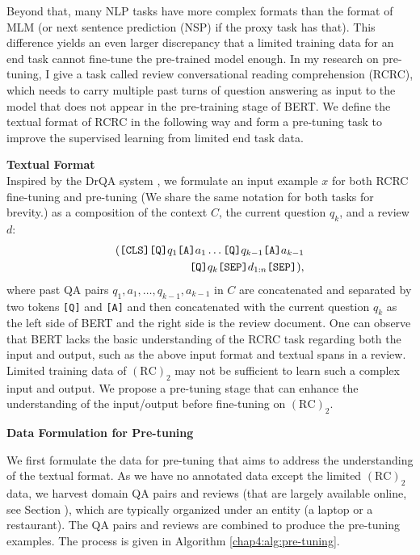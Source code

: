 Beyond that, many NLP tasks have more complex formats than the format of MLM (or next sentence prediction (NSP) if the proxy task has that).
This difference yields an even larger discrepancy that a limited training data for an end task cannot fine-tune the pre-trained model enough.
In my research on pre-tuning, I give a task called review conversational reading comprehension (RCRC), which needs to carry multiple past turns of question answering as input to the model that does not appear in the pre-training stage of BERT.
We define the textual format of RCRC in the following way and form a pre-tuning task to improve the supervised learning from limited end task data.

\textbf{Textual Format}\\
\label{chap4:sec:format}
Inspired by the DrQA system \cite{reddy2018coqa}, we formulate an input example $x$ for both RCRC fine-tuning and pre-tuning (We share the same notation for both tasks for brevity.) as a composition of the context $C$, the current question $q_k$, and a review $d$:
\vspace*{-2mm}
\begin{equation}
\begin{split}
(\texttt{[CLS]} \texttt{[Q]} q_1 \texttt{[A]} a_1 \dots \texttt{[Q]} q_{k-1} \texttt{[A]} a_{k-1} \\
\texttt{[Q]} q_{k} \texttt{[SEP]} d_{1:n} \texttt{[SEP]}),
\nonumber
\end{split}
\vspace*{-5mm}
\end{equation}
where past QA pairs $q_1, a_1, \dots, q_{k-1}, a_{k-1}$ in $C$ are concatenated and separated by two tokens \texttt{[Q]} and \texttt{[A]} and then concatenated with the current question $q_k$ as the left side of BERT and the right side is the review document.
One can observe that BERT lacks the basic understanding of the RCRC task regarding both the input and output, such as the above input format and textual spans in a review. Limited training data of $(\text{RC})_2$ may not be sufficient to learn such a complex input and output.
We propose a pre-tuning stage that can enhance the understanding of the input/output before fine-tuning on $(\text{RC})_2$.

\textbf{Data Formulation for Pre-tuning}
\label{chap4:sec:form}

We first formulate the data for pre-tuning that aims to address the understanding of the textual format.
As we have no annotated data except the limited $(\text{RC})_2$ data, we harvest domain QA pairs and reviews (that are largely available online, see Section 
), which are typically organized under an entity (a laptop or a restaurant). The QA pairs and reviews are combined to produce the pre-tuning examples. The process is given in Algorithm \ref{chap4:alg:pre-tuning}.


